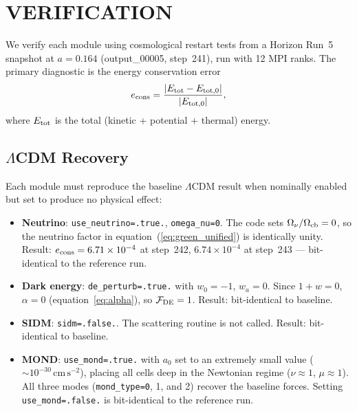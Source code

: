 \documentclass[fleqn,usenatbib]{mnras}
\newcommand{\code}[1]{\texttt{#1}}
\newcommand{\Onu}{\Omega_\nu}
\newcommand{\Ocb}{\Omega_{\rm cb}}
\newcommand{\azero}{a_0}
\begin{document}
\section{VERIFICATION}
\label{sec:verification}

We verify each module using cosmological restart tests from a
Horizon Run~5 \citep{Lee2021} snapshot at $a = 0.164$ (output\_00005,
step~241), run with 12 MPI ranks.  The primary diagnostic is the
energy conservation error
\begin{equation}
e_{\rm cons} = \frac{|E_{\rm tot} - E_{\rm tot,0}|}{|E_{\rm tot,0}|},
\label{eq:econs}
\end{equation}
where $E_{\rm tot}$ is the total (kinetic + potential + thermal)
energy.

\subsection{$\Lambda$CDM Recovery}
\label{sec:verify_lcdm}

Each module must reproduce the baseline $\Lambda$CDM result when
nominally enabled but set to produce no physical effect:

\begin{itemize}
\item \textbf{Neutrino}: \code{use\_neutrino=.true.},
  \code{omega\_nu=0}.  The code sets $\Onu/\Ocb = 0$, so the neutrino
  factor in equation~(\ref{eq:green_unified}) is identically unity.
  Result: $e_{\rm cons} = 6.71\times10^{-4}$ at step~242,
  $6.74\times10^{-4}$ at step~243 --- bit-identical to the reference
  run.

\item \textbf{Dark energy}: \code{de\_perturb=.true.} with
  $w_0=-1$, $w_a=0$.  Since $1+w=0$, $\alpha=0$
  (equation~\ref{eq:alpha}), so $\mathcal{F}_{\rm DE}=1$.  Result:
  bit-identical to baseline.

\item \textbf{SIDM}: \code{sidm=.false.}.  The scattering routine is
  not called.  Result: bit-identical to baseline.

\item \textbf{MOND}: \code{use\_mond=.true.} with $\azero$ set to an
  extremely small value (${\sim}10^{-30}\,\mathrm{cm\,s^{-2}}$),
  placing all cells deep in the Newtonian regime ($\nu \approx 1$,
  $\mu \approx 1$).
  All three modes (\code{mond\_type=0}, 1, and 2) recover the
  baseline forces.  Setting \code{use\_mond=.false.} is
  bit-identical to the reference run.
\end{itemize}
\end{document}
